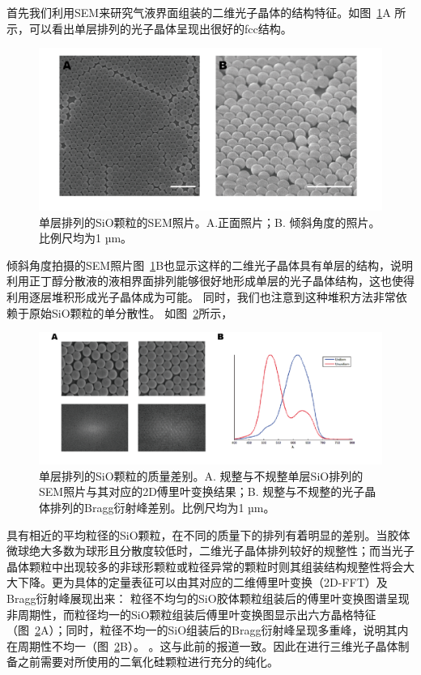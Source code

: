 首先我们利用SEM来研究气液界面组装的二维光子晶体的结构特征。如图~\ref{fig:mono-SEM}A
所示，可以看出单层排列的光子晶体呈现出很好的fcc结构。
\begin{figure}[htbp]
  \centering
  \includegraphics[width=0.8\linewidth]{figures/ch2/mono-SEM.png}
  \caption{单层排列的SiO颗粒的SEM照片。A.正面照片；B. 倾斜角度的照片。比例尺均为1 µm。}
  \label{fig:mono-SEM}
\end{figure}
倾斜角度拍摄的SEM照片图~\ref{fig:mono-SEM}B也显示这样的二维光子晶体具有单层的结构，说明利用正丁醇分散液的液相界面排列能够很好地形成单层的光子晶体结构，这也使得利用逐层堆积形成光子晶体成为可能。
同时，我们也注意到这种堆积方法非常依赖于原始SiO颗粒的单分散性。
如图~\ref{fig:mono-quality}所示，
\begin{figure}[htbp]
  \centering
  \includegraphics[width=\linewidth]{figures/ch2/mono-quality.png}
  \caption{单层排列的SiO颗粒的质量差别。A. 规整与不规整单层SiO排列的SEM照片与其对应的2D傅里叶变换结果；B. 规整与不规整的光子晶体排列的Bragg衍射峰差别。比例尺均为1 µm。}
  \label{fig:mono-quality}
\end{figure}
具有相近的平均粒径的SiO颗粒，在不同的质量下的排列有着明显的差别。当胶体微球绝大多数为球形且分散度较低时，二维光子晶体排列较好的规整性；而当光子晶体颗粒中出现较多的非球形颗粒或粒径异常的颗粒时则其组装结构规整性将会大大下降。更为具体的定量表征可以由其对应的二维傅里叶变换（2D-FFT）及Bragg衍射峰展现出来：
粒径不均匀的SiO胶体颗粒组装后的傅里叶变换图谱呈现非周期性，而粒径均一的SiO颗粒组装后傅里叶变换图显示出六方晶格特征（图~\ref{fig:mono-quality}A）；同时，粒径不均一的SiO组装后的Bragg衍射峰呈现多重峰，说明其内在周期性不均一（图~\ref{fig:mono-quality}B）。
。这与此前的报道一致\cite{Jiang2001Fabrication}。因此在进行三维光子晶体制备之前需要对所使用的二氧化硅颗粒进行充分的纯化。

